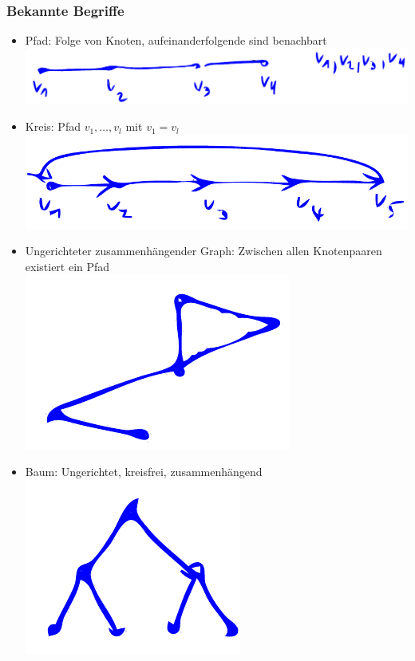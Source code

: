 \documentclass{scrartcl}
\begin{document}
\subsubsection{Bekannte Begriffe}

\begin{itemize}
	\item Pfad: Folge von Knoten, aufeinanderfolgende sind benachbart \\
	\includegraphics[width=\linewidth]{figures/pfad.pdf}
	\item Kreis: Pfad $ v_1,\ldots,v_l $ mit $ v_1=v_l $ \\
	\includegraphics[width=\linewidth]{figures/kreis.pdf}
	\item Ungerichteter zusammenhängender Graph: Zwischen allen Knotenpaaren existiert ein Pfad \\
	\includegraphics{figures/ungerichteter-zusammenhaengender-graph.pdf}
	\item Baum: Ungerichtet, kreisfrei, zusammenhängend \\
	\includegraphics{figures/baum.pdf}
\end{itemize}
\end{document}
